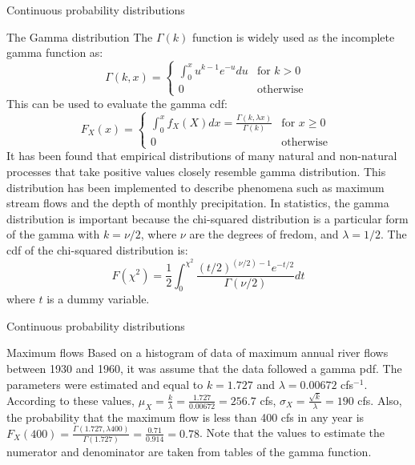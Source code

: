 \documentclass[8pt]{beamer}
\renewcommand{\emph}[1]{\textcolor{myorange}{#1}}
\begin{document}
\begin{frame}{Continuous probability distributions} 
    \begin{block}{The \alert{Gamma} distribution}
        The $\Gamma (k)$ function is widely used as the \emph{incomplete gamma function} as:
\[
\Gamma (k,x) =
\begin{cases}
    \int_0^x u^{k-1} e^{-u} du & \text{for } k > 0 \\
    0 & \text{otherwise }
\end{cases}
\]
This can be used to evaluate the gamma \emph{cdf}:
\[
F_X (x) =
\begin{cases}
    \int_0^x f_X (X) dx = \frac{\Gamma (k, \lambda x)}{\Gamma (k)} & \text{for } x \geq 0 \\
    0 & \text{otherwise }
\end{cases}
\]
It has been found that empirical distributions of many natural and non-natural processes that take positive values closely resemble \emph{gamma distribution}. This distribution has been implemented to describe phenomena such as maximum stream flows and the depth of monthly precipitation. In statistics, the \emph{gamma distribution} is important because the \alert{chi-squared distribution} is a particular form of the gamma with $k=\nu /2$, where $\nu$ are the degrees of fredom, and $\lambda = 1/2$. The \emph{cdf} of the \emph{chi-squared distribution} is:
\[
    F (\chi^2) = \frac{1}{2} \int_0^{\chi^2} \frac{(t/2)^{(\nu/2)-1} e^{-t/2}}{\Gamma (\nu/2)} dt
\]
where $t$ is a dummy variable.
    \end{block}
\end{frame}

\begin{frame}{Continuous probability distributions} 
 \begin{exampleblock}{Maximum flows}
     Based on a histogram of data of maximum annual river flows between 1930 and 1960, it was assume that the data followed a \emph{gamma pdf}. The parameters were estimated and equal to $k= 1.727$ and $\lambda = 0.00672$ cfs$^{-1}$. According to these values, $\mu_X = \frac{k}{\lambda} = \frac{1.727}{0.00672} = 256.7$ cfs, $\sigma_X  = \frac{\sqrt{k}}{\lambda} = 190$ cfs. Also, the probability that the maximum flow is less than 400 cfs in any year is $F_X (400) = \frac{\Gamma (1.727, \lambda 400)}{\Gamma (1.727)} = \frac{0.71}{0.914} = 0.78$. Note that the values to estimate the numerator and denominator are taken from tables of the gamma function. 
    \end{exampleblock}
\end{frame}
\end{document}
